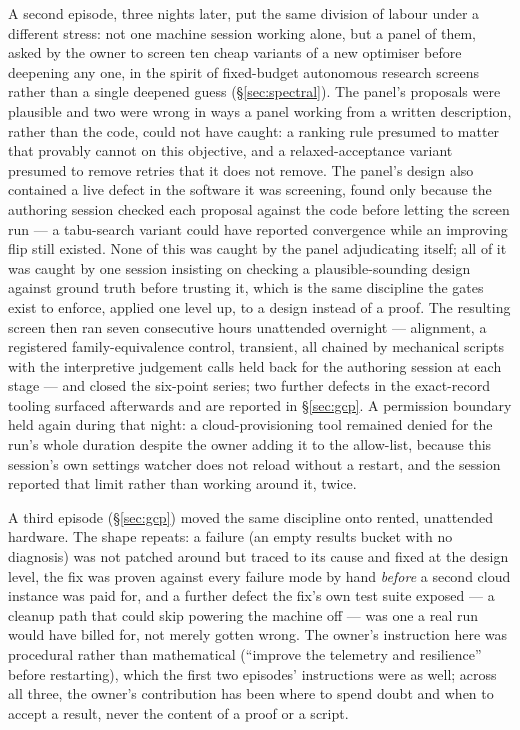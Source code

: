\documentclass[11pt,a4paper]{article}
\theoremstyle{definition}
\theoremstyle{plain}
\begin{document}
A second episode, three nights later, put the same division of labour under a different stress:
not one machine session working alone, but a panel of them, asked by the owner to screen ten
cheap variants of a new optimiser before deepening any one, in the spirit of fixed-budget
autonomous research screens rather than a single deepened guess (\S\ref{sec:spectral}). The
panel's proposals were plausible and two were wrong in ways a panel working from a written
description, rather than the code, could not have caught: a ranking rule presumed to matter that
provably cannot on this objective, and a relaxed-acceptance variant presumed to remove retries
that it does not remove. The panel's design also contained a live defect in the software it was
screening, found only because the authoring session checked each proposal against the code
before letting the screen run --- a tabu-search variant could have reported convergence while an
improving flip still existed. None of this was caught by the panel adjudicating itself; all of it
was caught by one session insisting on checking a plausible-sounding design against ground truth
before trusting it, which is the same discipline the gates exist to enforce, applied one level
up, to a design instead of a proof. The resulting screen then ran seven consecutive hours
unattended overnight --- alignment, a registered family-equivalence control, transient, all
chained by mechanical scripts with the interpretive judgement calls held back for the authoring
session at each stage --- and closed the six-point series; two further defects in the
exact-record tooling surfaced afterwards and are reported in \S\ref{sec:gcp}. A
permission boundary held again during that night: a cloud-provisioning tool remained denied for
the run's whole duration despite the owner adding it to the allow-list, because this session's
own settings watcher does not reload without a restart, and the session reported that limit
rather than working around it, twice.

A third episode (\S\ref{sec:gcp}) moved the same discipline onto rented, unattended hardware. The
shape repeats: a failure (an empty results bucket with no diagnosis) was not patched around but
traced to its cause and fixed at the design level, the fix was proven against every failure mode
by hand \emph{before} a second cloud instance was paid for, and a further defect the fix's own
test suite exposed --- a cleanup path that could skip powering the machine off --- was one a real
run would have billed for, not merely gotten wrong. The owner's instruction here was procedural
rather than mathematical (``improve the telemetry and resilience'' before restarting), which the
first two episodes' instructions were as well; across all three, the owner's contribution has been
where to spend doubt and when to accept a result, never the content of a proof or a script.
\end{document}
